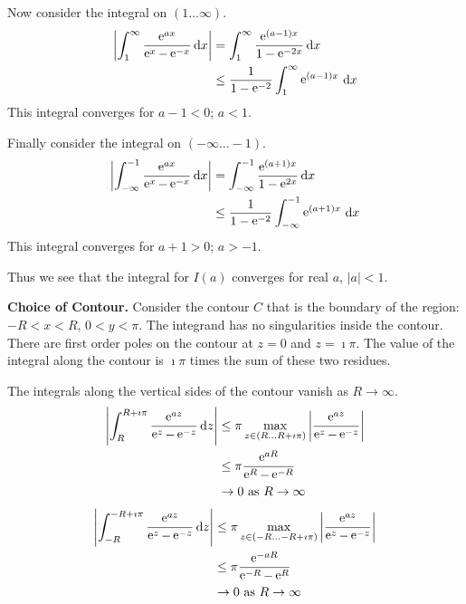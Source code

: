 {\begin{Solution}
  Now consider the integral on $(1 \ldots \infty)$.
  \begin{align*}
    \left| \int_1^\infty \frac{ \mathop{\mathrm{e}}\nolimits^{a x} }{ \mathop{\mathrm{e}}\nolimits^x - \mathop{\mathrm{e}}\nolimits^{-x} } \,\mathrm{d} x \right|
    &= \int_1^\infty \frac{ \mathop{\mathrm{e}}\nolimits^{(a-1) x} }{ 1 - \mathop{\mathrm{e}}\nolimits^{-2x} } \,\mathrm{d} x \\
    &\leq \frac{1}{1 - \mathop{\mathrm{e}}\nolimits^{-2} } \int_1^\infty \mathop{\mathrm{e}}\nolimits^{(a-1) x} \,\mathrm{d} x
  \end{align*}
  This integral converges for $a-1 < 0$; $a < 1$.

  Finally consider the integral on $(-\infty \ldots -1)$.
  \begin{align*}
    \left| \int_{-\infty}^{-1} \frac{ \mathop{\mathrm{e}}\nolimits^{a x} }{ \mathop{\mathrm{e}}\nolimits^x - \mathop{\mathrm{e}}\nolimits^{-x} } \,\mathrm{d} x \right|
    &= \int_{-\infty}^{-1} \frac{ \mathop{\mathrm{e}}\nolimits^{(a+1) x} }{ 1 - \mathop{\mathrm{e}}\nolimits^{2x} } \,\mathrm{d} x \\
    &\leq \frac{1}{1 - \mathop{\mathrm{e}}\nolimits^{-2} } \int_{-\infty}^{-1} \mathop{\mathrm{e}}\nolimits^{(a+1) x} \,\mathrm{d} x
  \end{align*}
  This integral converges for $a+1 > 0$; $a > -1$.

  Thus we see that the integral for $I(a)$ converges for real $a$, $|a| < 1$.


  \textbf{Choice of Contour.}
  Consider the contour $C$ that is the boundary of the region:
  $-R < x < R$, $0 < y < \pi$.  The integrand has no singularities inside
  the contour.  There are first order poles on the contour at $z = 0$
  and $z = \imath \pi$.  The value of the integral along the contour is 
  $\imath \pi$ times the sum of these two residues.

  The integrals along the vertical sides of the contour vanish as 
  $R \to \infty$.
  \begin{align*}
    \left| \int_{R}^{R + \imath \pi} \frac{ \mathop{\mathrm{e}}\nolimits^{a z} }{ \mathop{\mathrm{e}}\nolimits^z - \mathop{\mathrm{e}}\nolimits^{-z} } \,\mathrm{d} z \right|
    &\leq \pi \max_{z \in (R \ldots R + \imath \pi)}
    \left| \frac{ \mathop{\mathrm{e}}\nolimits^{a z} }{ \mathop{\mathrm{e}}\nolimits^z - \mathop{\mathrm{e}}\nolimits^{-z} } \right| \\
    &\leq \pi \frac{ \mathop{\mathrm{e}}\nolimits^{a R} }{ \mathop{\mathrm{e}}\nolimits^R - \mathop{\mathrm{e}}\nolimits^{-R} } \\
    &\to 0\ \mathrm{as}\ R \to \infty
  \end{align*}
  \begin{align*}
    \left| \int_{-R}^{-R + \imath \pi} \frac{ \mathop{\mathrm{e}}\nolimits^{a z} }{ \mathop{\mathrm{e}}\nolimits^z - \mathop{\mathrm{e}}\nolimits^{-z} } \,\mathrm{d} z \right|
    &\leq \pi \max_{z \in (-R \ldots -R + \imath \pi)}
    \left| \frac{ \mathop{\mathrm{e}}\nolimits^{a z} }{ \mathop{\mathrm{e}}\nolimits^z - \mathop{\mathrm{e}}\nolimits^{-z} } \right| \\
    &\leq \pi \frac{ \mathop{\mathrm{e}}\nolimits^{-a R} }{ \mathop{\mathrm{e}}\nolimits^{-R} - \mathop{\mathrm{e}}\nolimits^R } \\
    &\to 0\ \mathrm{as}\ R \to \infty
  \end{align*}



\end{Solution}}
